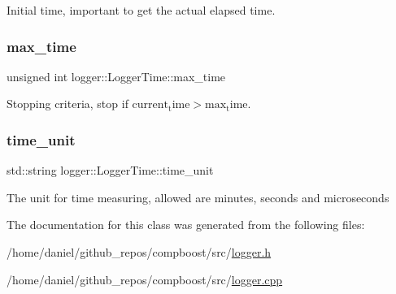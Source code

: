 Initial time, important to get the actual elapsed time. 

\mbox{\label{classlogger_1_1_logger_time_a1aec07a58b6d91c7931e627fc25018ff}} 
\subsubsection{\texorpdfstring{max\+\_\+time}{max\_time}}
{\footnotesize\ttfamily unsigned int logger\+::\+Logger\+Time\+::max\+\_\+time\hspace{0.3cm}{\ttfamily [private]}}



Stopping criteria, stop if $\mathrm{current_time} > \mathrm{max_time}$. 

\mbox{\label{classlogger_1_1_logger_time_a98bc56e547f8f32a3db03907347335da}} 
\subsubsection{\texorpdfstring{time\+\_\+unit}{time\_unit}}
{\footnotesize\ttfamily std\+::string logger\+::\+Logger\+Time\+::time\+\_\+unit\hspace{0.3cm}{\ttfamily [private]}}



The unit for time measuring, allowed are {\ttfamily minutes}, {\ttfamily seconds} and {\ttfamily microseconds} 



The documentation for this class was generated from the following files\+:\begin{DoxyCompactItemize}
\item 
/home/daniel/github\+\_\+repos/compboost/src/\hyperlink{logger_8h}{logger.\+h}\item 
/home/daniel/github\+\_\+repos/compboost/src/\hyperlink{logger_8cpp}{logger.\+cpp}\end{DoxyCompactItemize}
